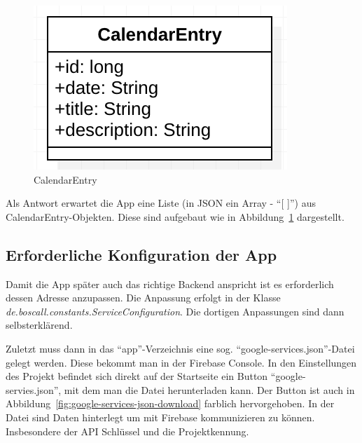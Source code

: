 \begin{figure}[h]
	\centering
	\includegraphics{include/img/calendarentry}
	\caption{CalendarEntry}
	\label{fig:calendarEntry}
\end{figure}
Als Antwort erwartet die App eine Liste (in JSON ein Array - \enquote{[ ]}) aus CalendarEntry-Objekten. Diese sind aufgebaut wie in Abbildung~\ref{fig:calendarEntry} dargestellt.

\subsection{Erforderliche Konfiguration der App}
Damit die App später auch das richtige Backend anspricht ist es erforderlich dessen Adresse anzupassen. Die Anpassung erfolgt in der Klasse\\ \textit{de.boscall.constants.ServiceConfiguration}. Die dortigen Anpassungen sind dann selbsterklärend.

Zuletzt muss dann in das \enquote{app}-Verzeichnis eine sog. \enquote{google-services.json}-Datei gelegt werden. Diese bekommt man in der Firebase Console. In den Einstellungen des Projekt befindet sich direkt auf der Startseite ein Button \enquote{google-servies.json}, mit dem man die Datei herunterladen kann. Der Button ist auch in Abbildung~\ref{fig:google-services-json-download} farblich hervorgehoben. In der Datei sind Daten hinterlegt um mit Firebase kommunizieren zu können. Insbesondere der API Schlüssel und die Projektkennung.